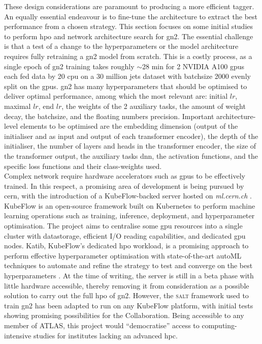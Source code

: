 These design considerations are paramount to producing a more efficient tagger. An equally essential endeavour is to fine-tune the architecture to extract the best performance from a chosen strategy. This section focuses on some initial studies to perform \gls{hpo} and network architecture search for \gls{gn2}. The essential challenge is that a test of a change to the hyperparameters or the model architecture requires fully retraining a \gls{gn2} model from scratch. This is a costly process, as a single epoch of \gls{gn2} training takes roughly $\sim$28 min for 2 NVIDIA A100 \glspl{gpu} each fed data by 20 \gls{cpu} on a 30 million jets dataset with batchsize 2000 evenly split on the \glspl{gpu}. \gls{gn2} has many hyperparameters that should be optimised to deliver optimal performance, among which the most relevant are: initial $lr$, maximal $lr$, end $lr$, the weights of the 2 auxiliary tasks, the amount of weight decay, the batchsize, and the floating numbers precision. Important architecture-level elements to be optimised are the embedding dimension (output of the initialiser and as input and output of each transformer encoder), the depth of the initialiser, the number of layers and heads in the transformer encoder, the size of the transformer output, the auxiliary tasks \gls{dnn}, the activation functions, and the specific loss functions and their class-weights used. \\

Complex network require hardware accelerators such as \glspl{gpu} to be effectively trained. In this respect, a promising area of development is being pursued by \gls{cern}, with the introduction of a KubeFlow-backed server hosted on \textit{ml.cern.ch} \cite{KubeFlowCern}. KubeFlow is an open-source framework built on Kubernetes to perform machine learning operations such as training, inference, deployment, and hyperparameter optimisation. The project aims to centralise some \gls{gpu} resources into a single cluster with datastorage, efficient I/O reading capabilities, and dedicated \gls{gpu} nodes. Katib, KubeFlow's dedicated \gls{hpo} workload, is a promising approach to perform effective hyperparameter optimisation with state-of-the-art autoML techniques to automate and refine the strategy to test and converge on the best hyperparameters \cite{george2020katib}. At the time of writing, the server is still in a beta phase with little hardware accessible, thereby removing it from consideration as a possible solution to carry out the full \gls{hpo} of \gls{gn2}. However, the \textsc{salt} framework used to train \gls{gn2} has been adapted to run on any KubeFlow platform, with initial tests showing promising possibilities for the Collaboration. Being accessible to any member of ATLAS, this project would ``democratise'' access to computing-intensive studies for institutes lacking an advanced \gls{hpc}. \\

